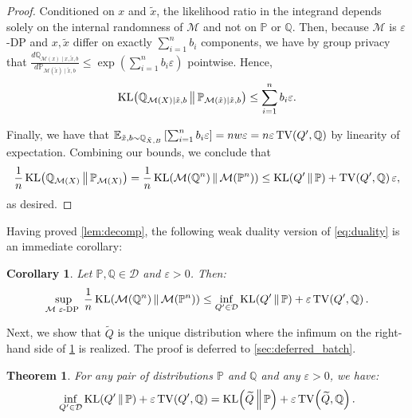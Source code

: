 \documentclass{article}
\DeclareMathOperator{\KLop}{KL}
\newcommand{\KL}[2]{%
  \mathchoice
    {\KLop\!\left(#1\,\middle\|\,#2\right)}%
    {\KLop(#1\,\Vert\,#2)}%
    {\KLop(#1\,\Vert\,#2)}%
    {\KLop(#1\,\Vert\,#2)}%
}
\DeclareMathOperator{\TVop}{TV}
\newcommand{\TV}[2]{
  \mathchoice
    {\TVop\!\left(#1,#2\right)}%
    {\TVop(#1,#2)}%
    {\TVop(#1,#2)}%
    {\TVop(#1,#2)}%
}
\newcommand{\Null}{\mathbb{P}}
\newcommand{\E}{\mathbb{E}}
\newcommand{\Alt}{\mathbb{Q}}
\newcommand{\M}{\mathcal{M}}
\newcommand{\eps}{\varepsilon}
\newtheorem{theorem}{Theorem}[section]
\newtheorem{corollary}{Corollary}[theorem]
\begin{document}
\begin{proof}
Conditioned on $x$ and $\tilde x$, the likelihood ratio in the integrand depends solely on the internal randomness of $\M$ and not on $\Null$ or $\Alt$. Then, because $\M$ is $\eps$-DP and $x, \tilde x$ differ on exactly $\sum_{i=1}^n b_i$ components, we have by group privacy that $\frac{d\Alt_{\M(x)\mid x, \tilde x, b}}{d\Null_{\M(\tilde x) \mid \tilde x, b}} \leq \exp(\sum_{i=1}^n b_i\eps)$ pointwise. Hence,
\begin{equation}\label{eq:jc+gp}
\KL{\Alt_{\M(X) \mid \tilde x, b}}{\Null_{\M(\tilde x) \mid \tilde x, b}}
    \leq \sum_{i=1}^n b_i\eps.
\end{equation}

Finally, we have that $\E_{\tilde x, b \sim \Alt_{\tilde X, B}}\left[\sum_{i=1}^n b_i\eps \right] = nw\eps = n\eps \TV{Q'}{\Alt}$ by linearity of expectation. Combining our bounds, we conclude that
\begin{equation*}
    \frac{1}{n}\KL{\Alt_{\M(X)}}{\Null_{\M(X)}} = \frac{1}{n}\KL{\M(\Alt^n)}{\M(\Null^n)} \leq \KL{Q'}{\Null} + \TV{Q'}{\Alt}\eps,
\end{equation*}
as desired.
\end{proof}

Having proved \cref{lem:decomp}, the following weak duality version of \cref{eq:duality} is an immediate corollary:
\begin{corollary}\label{cor:one-sided}
    Let $\Null, \Alt \in\mathcal{D}$ and $\eps > 0$. Then:
    \begin{equation*}
        \sup_{\M \hspace{.1cm}\eps\text{-DP }} \frac{1}{n} \KL{\M(\Alt^n)}{\M(\Null^n)} \leq \inf_{Q' \in \mathcal{D}} \KL{Q'}{\Null} + \eps \TV{Q'}{\Alt}.
    \end{equation*}
\end{corollary}

Next, we show that $\widetilde Q$ is the unique distribution where the infimum on the right-hand side of \cref{cor:one-sided} is realized. The proof is deferred to \cref{sec:deferred_batch}.

\begin{theorem}\label{thm:e-power-ub}
    For any pair of distributions $\Null$ and $\Alt$ and any $\varepsilon > 0$, we have:
    \begin{equation*}
        \inf_{Q' \in \mathcal{D}} \KL{Q'}{\Null} + \eps \TV{Q'}{\Alt}  = \KL{\widetilde Q}{\Null} + \eps \TV{\widetilde Q}{\Alt}.
    \end{equation*}
\end{theorem}
\end{document}
